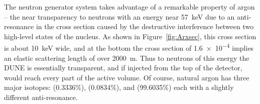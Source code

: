 

The neutron generator system takes advantage of a remarkable property of argon -- the near transparency to neutrons with an energy near \SI{57}{\keV} due to an anti-resonance in the cross section caused by the destructive interference between two high-level states of the  nucleus. As shown in Figure~\ref{fig:Arxsec}, this cross section is about \SI{10}{\keV} wide, and at the bottom the cross section of \num{1.6e-4} %
implies an elastic scattering length of over \SI{2000}{\m}. Thus to neutrons of this energy the DUNE  %
is essentially transparent, and if injected from the top of the detector, would reach every part of the active volume. Of course, natural argon has three major isotopes:  (0.3336\%),  (0.0834\%), and  (99.6035\%) each with a slightly different anti-resonance. 

